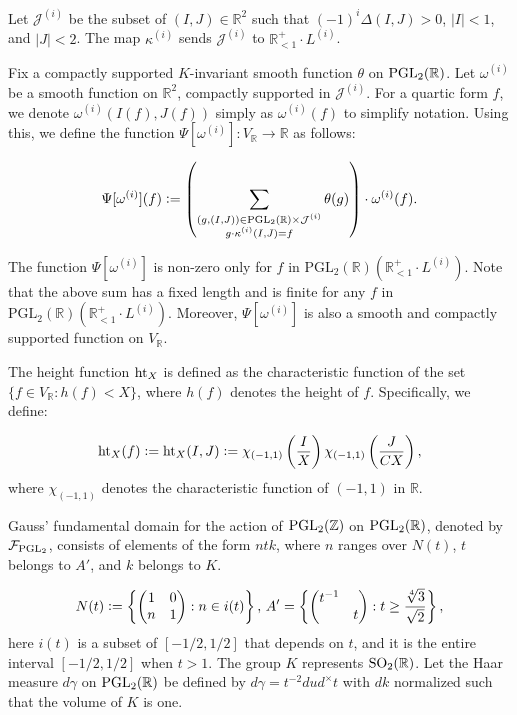 \documentclass{article}
\def\SO{{\rm SO}}
\def\PGL{{\rm PGL}}
\def\R{{\mathbb R}}
\def \h{{\rm ht}}
\def \dw{{t^{-2}dud^\times t  }}
\begin{document}
Let $\mathcal{J}^{(i)}$ be the subset of $(I, J) \in \mathbb{R}^2$ such that $(-1)^{i}\Delta(I, J) > 0$, $|I| < 1$, and $|J| < 2$. The map $\kappa^{(i)}$ sends $\mathcal{J}^{(i)}$ to $\mathbb{R}^{+}_{<1} \cdot L^{(i)}$.

Fix a compactly supported $K$-invariant smooth function $\theta$ on $\PGL_2(\mathbb{R})$. Let $\omega^{(i)}$ be a smooth function on $\mathbb{R}^2$, compactly supported in $\mathcal{J}^{(i)}$. For a quartic form $f$, we denote $\omega^{(i)}(I(f), J(f))$ simply as $\omega^{(i)}(f)$ to simplify notation. Using this, we define the function $\Psi[\omega^{(i)}]: V_{\mathbb{R}} \to \mathbb{R}$ as follows:

\begin{equation*}
\Psi[\omega^{(i)}](f) \vcentcolon=  \left(\sum _{\substack{(g,(I,J))\in \PGL_2(\R) \times \mathcal{J}^{(i)}\\  g \cdot \kappa^{(i)}(I,J) = f }} \theta(g) \right) \cdot \omega^{(i)}(f).
\end{equation*}


The function $\Psi[\omega^{(i)}]$ is non-zero only for $f$ in $\mathrm{PGL}_2(\mathbb{R}) \left(\mathbb{R}^{+}_{<1} \cdot L^{(i)}\right)$. Note that the above sum has a fixed length and is finite for any $f$ in $\mathrm{PGL}
_2(\mathbb{R}) \left(\mathbb{R}^{+}_{<1} \cdot L^{(i)}\right)$. Moreover, $\Psi[\omega^{(i)}]$ is also a smooth and compactly supported function on $V_{\mathbb{R}}$.


The height function $\h_X$ is defined as the characteristic function of the set $\{f \in V_{\mathbb{R}} : h(f) < X\}$, where $h(f)$ denotes the height of $f$. Specifically, we define:

\begin{equation*} \h_X(f) \vcentcolon= \h_{X}(I,J) \vcentcolon= \chi_{(-1,1)}\left(\frac{I}{X}\right) \chi_{(-1,1)}\left(\frac{J}{CX}\right), \end{equation*} where $\chi_{(-1,1)}$ denotes the characteristic function of $(-1,1)$ in $\R$.

Gauss' fundamental domain for the action of $\PGL_2(\mathbb{Z})$ on $\PGL_2(\mathbb{R})$, denoted by $\mathcal{F}_{\PGL_2}$, consists of elements of the form $ntk$, where $n$ ranges over $N(t)$, $t$ belongs to $A'$, and $k$ belongs to $K$.

\begin{equation*}
N(t) \vcentcolon= \left\{ \begin{pmatrix} 1 & 0\\ n & 1\end{pmatrix}: n \in i(t) \right\}
, \,
A'= \left\{\begin{pmatrix} t^{-1} & \\  & t\end{pmatrix}: t \geq  \frac{\sqrt[4]{3}}{\sqrt{2}} \right\},
\end{equation*} 
here $i(t)$ is a subset of $[-1/2, 1/2]$ that depends on $t$, and it is the entire interval $[-1/2, 1/2]$ when $t > 1$. The group $K$ represents $\SO_2(\mathbb{R})$. Let the Haar measure $d\gamma$ on $\PGL_2(\mathbb{R})$ be defined by $d\gamma = \dw$ with $dk$ normalized such that the volume of $K$ is one.
\end{document}
